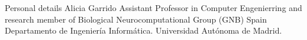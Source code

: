 \begin{rubric}{Personal details}
Alicia Garrido
Assistant Professor in Computer Engenierring and research member of Biological Neurocomputational Group (GNB)
Spain
Departamento de Ingeniería Informática. Universidad Autónoma de Madrid.

\end{rubric}